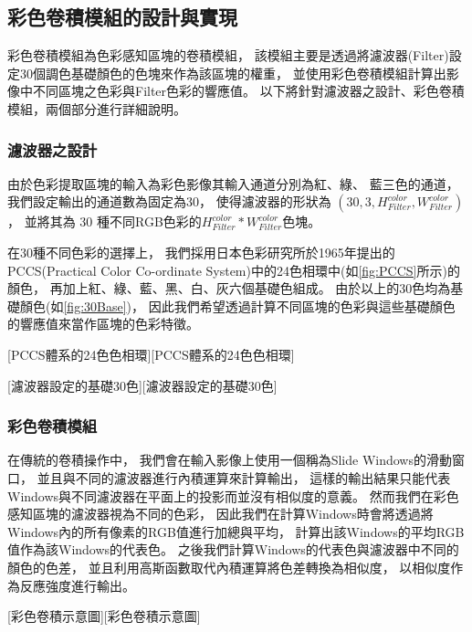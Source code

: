 \documentclass[class=NCU_thesis, crop=false]{standalone}
\begin{document}
	\subsection{彩色卷積模組的設計與實現}
		彩色卷積模組為色彩感知區塊的卷積模組，
		該模組主要是透過將濾波器(Filter)設定30個調色基礎顏色的色塊來作為該區塊的權重，
		並使用彩色卷積模組計算出影像中不同區塊之色彩與Filter色彩的響應值。
		以下將針對濾波器之設計、彩色卷積模組，兩個部分進行詳細說明。
		
		\subsubsection{濾波器之設計}
			由於色彩提取區塊的輸入為彩色影像其輸入通道分別為紅、綠、 藍三色的通道，
			我們設定輸出的通道數為固定為30，
			使得濾波器的形狀為 $\left(30 , 3, H^{color}_{Filter},  W^{color}_{Filter} \right)$，
			並將其為 30 種不同RGB色彩的$H^{color}_{Filter} * W^{color}_{Filter}$色塊。

			在30種不同色彩的選擇上，
			我們採用日本色彩研究所於1965年提出的PCCS(Practical Color Co-ordinate System)中的24色相環中(如\cref{fig:PCCS}所示)的顏色，
			再加上紅、綠、藍、黑、白、灰六個基礎色組成。
			由於以上的30色均為基礎顏色(如\cref{fig:30Base})，
			因此我們希望透過計算不同區塊的色彩與這些基礎顏色的響應值來當作區塊的色彩特徵。

			[PCCS體系的24色色相環\cite{PCCScite}][PCCS體系的24色色相環]

			[濾波器設定的基礎30色][濾波器設定的基礎30色]

		\subsubsection{彩色卷積模組}
			在傳統的卷積操作中，
			我們會在輸入影像上使用一個稱為Slide Windows的滑動窗口，
			並且與不同的濾波器進行內積運算來計算輸出，
			這樣的輸出結果只能代表Windows與不同濾波器在平面上的投影而並沒有相似度的意義。
			然而我們在彩色感知區塊的濾波器視為不同的色彩，
			因此我們在計算Windows時會將透過將Windows內的所有像素的RGB值進行加總與平均，
			計算出該Windows的平均RGB值作為該Windows的代表色。
			之後我們計算Windows的代表色與濾波器中不同的顏色的色差，
			並且利用高斯函數取代內積運算將色差轉換為相似度，
			以相似度作為反應強度進行輸出。

			[彩色卷積示意圖]
\end{document}
